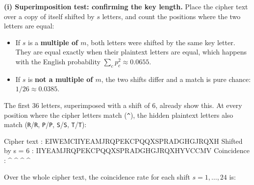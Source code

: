 \documentclass[a4paper, 10pt]{article}
\begin{document}
\begin{problem}
\begin{subproblems_alpha}
\begin{solution}
		      \textbf{(i) Superimposition test: confirming the key length.}
		      Place the cipher text over a copy of itself shifted by $s$ letters, and count the positions where the two letters are equal:
		      \begin{itemize}
			      \item If $s$ is a \textbf{multiple of $m$}, both letters were shifted by the same key letter.
			            They are equal exactly when their plaintext letters are equal, which happens with the English probability
			            $\sum_c p_c^2 \approx 0.0655$.
			      \item If $s$ is \textbf{not a multiple of $m$}, the two shifts differ and a match is pure chance: $1/26 \approx 0.0385$.
		      \end{itemize}
		      The first 36 letters, superimposed with a shift of 6, already show this.
		      At every position where the cipher letters match (\texttt{\textasciicircum}), the hidden plaintext letters also match
		      (\texttt{R}/\texttt{R}, \texttt{P}/\texttt{P}, \texttt{S}/\texttt{S}, \texttt{T}/\texttt{T}):
		      \begin{codingbox*}[numbers=none, xleftmargin=0pt, belowskip=6pt, basicstyle=\ttfamily\footnotesize\color{editortext}]
Cipher text      : EIWEMCIIYEAMJRQPEKCPQQXSPRADGHGJRQXH
Shifted by s = 6 : IIYEAMJRQPEKCPQQXSPRADGHGJRQXHYVCCMV
Coincidence      :  ^ ^          ^              ^
\end{codingbox*}
		      Over the whole cipher text, the coincidence rate for each shift $s = 1, \ldots, 24$ is:
		      \begin{center}
\end{center}
\end{solution}
\end{subproblems_alpha}
\end{problem}
\end{document}
